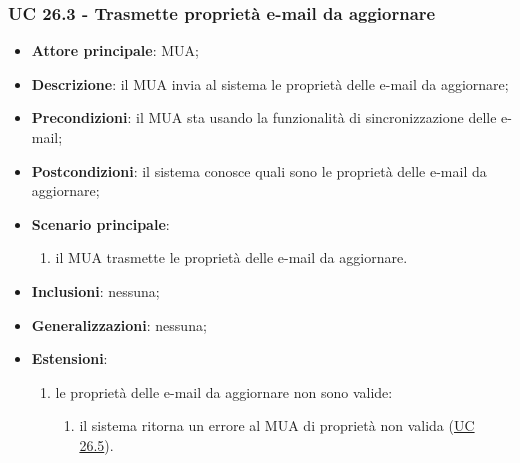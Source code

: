     \subsubsection{UC 26.3 - Trasmette proprietà e-mail da aggiornare} \label{sec:UC26.3}
    \begin{itemize}
        \item \textbf{Attore principale}: MUA;
        \item \textbf{Descrizione}: il MUA invia al sistema le proprietà delle e-mail da aggiornare;
        \item \textbf{Precondizioni}: il MUA sta usando la funzionalità di sincronizzazione delle e-mail;
        \item \textbf{Postcondizioni}: il sistema conosce quali sono le proprietà delle e-mail da aggiornare;
        \item \textbf{Scenario principale}:
            \begin{enumerate}
                \item il MUA trasmette le proprietà delle e-mail da aggiornare.
            \end{enumerate}
        \item \textbf{Inclusioni}: nessuna;
        \item \textbf{Generalizzazioni}: nessuna;
        \item \textbf{Estensioni}:
            \begin{enumerate}[label=\alph*.]
                \item le proprietà delle e-mail da aggiornare non sono valide:
                \begin{enumerate}[label=\arabic*.]
                    \item il sistema ritorna un errore al MUA di proprietà non valida (\hyperref[sec:UC26.5]{UC 26.5}).
                \end{enumerate}
            \end{enumerate}
    \end{itemize}


